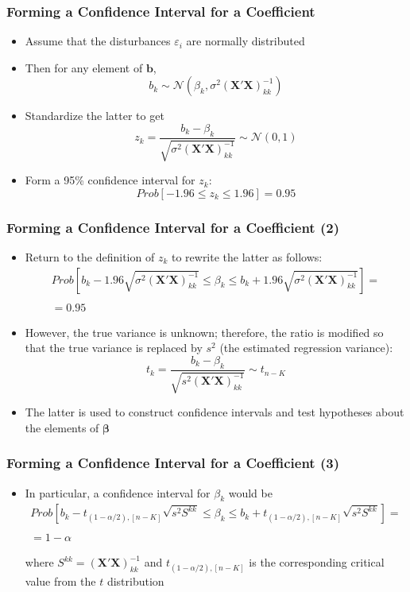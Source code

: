 \documentclass[10pt]{beamer}
\theoremstyle{definition}
\begin{document}
\begin{frame}
	\frametitle{Forming a Confidence Interval for a Coefficient}
	\begin{itemize}
		\item Assume that the disturbances $ \varepsilon_{i} $ are normally distributed
		\item Then for any element of $ \mathbf{b} $,
		\[
		b_{k} \sim \mathcal{N}(\beta_{k}, \sigma^{2}(\mathbf{X'X})^{-1}_{kk})
		\]
		\item Standardize the latter to get
		\[
		z_{k} = \dfrac{b_{k} - \beta_{k}}{\sqrt{\sigma^{2}(\mathbf{X'X})^{-1}_{kk}}} \sim \mathcal{N}(0,1)
		\]
		\item Form a 95\% confidence interval for $ z_{k} $:
		\[
		Prob[-1.96 \leq z_{k} \leq 1.96] = 0.95
		\]
	\end{itemize}
\end{frame}

\begin{frame}
	\frametitle{Forming a Confidence Interval for a Coefficient (2)}
	\begin{itemize}
		\item Return to the definition of $ z_{k} $ to rewrite the latter as follows:
		\[
		\begin{array}{lcl}
		Prob\left[b_{k} - 1.96\sqrt{\sigma^{2}(\mathbf{X'X})^{-1}_{kk}} \leq \beta_{k} \leq b_{k} +  1.96\sqrt{\sigma^{2}(\mathbf{X'X})^{-1}_{kk}}\right] = \\
		\quad\\
		= 0.95
		\end{array}
		\]
		\item However, the true variance is unknown; therefore, the ratio is modified so that the true variance is replaced by $ s^{2} $ (the estimated regression variance):
		\[
		t_{k} = \dfrac{b_{k} - \beta_{k}}{\sqrt{s^{2}(\mathbf{X'X})^{-1}_{kk}}} \sim t_{n - K}
		\]
		\item The latter is used to construct confidence intervals and test hypotheses about the elements of $ \boldsymbol\beta $
	\end{itemize}
\end{frame}

\begin{frame}[fragile]
	\frametitle{Forming a Confidence Interval for a Coefficient (3)}
	\begin{itemize}
		\item In particular, a confidence interval for $ \beta_{k} $ would be
		\[
		\begin{array}{lcl}
		Prob\left[b_{k} - t_{(1 - \alpha/2), [n - K]}\sqrt{s^{2}S^{kk}} \leq \beta_{k} \leq b_{k} +  t_{(1 - \alpha/2), [n - K]}\sqrt{s^{2}S^{kk}}\right] = \\
		\quad\\
		= 1 - \alpha
		\end{array}
		\]
		
		where $ S^{kk} =  (\mathbf{X'X})^{-1}_{kk} $ and $ t_{(1 - \alpha/2), [n - K]} $ is the corresponding critical value from the $ t $ distribution 
	\end{itemize}	
\end{frame}
\end{document}
